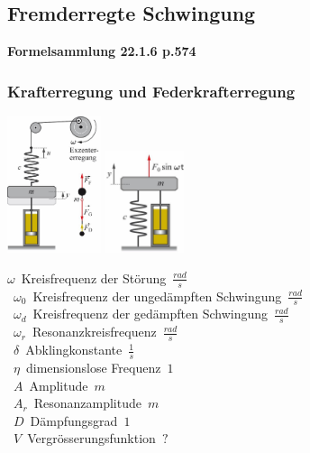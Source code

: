 \subsection{Fremderregte Schwingung}
\textbf{Formelsammlung 22.1.6 p.574}
\subsubsection{Krafterregung und Federkrafterregung}
\begin{center}
	\begin{minipage}{0.3\textwidth}
	\end{minipage}%
	\begin{minipage}{0.2\textwidth}
		\begin{center}
			\includegraphics[height=4cm,keepaspectratio=true]{Images/krafterregung_a.png}
			\includegraphics[height=3cm,keepaspectratio=true]{Images/krafterregung_b.png}
		\end{center}
	\end{minipage}
\end{center}

\unit{$\omega$}{Kreisfrequenz der Störung}{$\frac{rad}{s}$} \\
\unit{$\omega_0$}{Kreisfrequenz der ungedämpften Schwingung}{$\frac{rad}{s}$} \\
\unit{$\omega_d$}{Kreisfrequenz der gedämpften Schwingung}{$\frac{rad}{s}$} \\
\unit{$\omega_r$}{Resonanzkreisfrequenz}{$\frac{rad}{s}$} \\
\unit{$\delta$}{Abklingkonstante}{$\frac{1}{s}$} \\
\unit{$\eta$}{dimensionslose Frequenz}{$1$} \\
\unit{$A$}{Amplitude}{$m$} \\
\unit{$A_r$}{Resonanzamplitude}{$m$} \\
\unit{$D$}{Dämpfungsgrad}{$1$} \\
\unit{$V$}{Vergrösserungsfunktion}{$?$} \\

